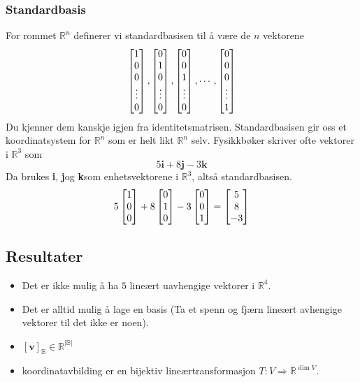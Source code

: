 \documentclass[12pt,a4paper,norsk]{article}
\makeatletter
\newcommand{\R}{\mathbb{R}}
\newcommand{\B}{\mathbb{B}}
\newcommand{\mat}[2]{\left[\begin{array}{@{}#1@{}}#2\end{array}\right]}
\newcommand{\vv}{\textbf{v}}
\newcommand{\vi}{\textbf{i}}
\newcommand{\vj}{\textbf{j}}
\newcommand{\vk}{\textbf{k}}
\makeatother
\begin{document}
\subsubsection{Standardbasis}
For rommet $\R^{n}$ definerer vi standardbasisen til å være de $n$ vektorene
\[\mat{c}{1\\0\\0\\ \vdots \\ 0}, \mat{c}{0\\1\\0\\ \vdots \\ 0}, \mat{c}{0\\0\\1\\ \vdots \\ 0}, \cdots, \mat{c}{0\\0\\0\\ \vdots \\ 1}\]
Du kjenner dem kanskje igjen fra identitetsmatrisen.
Standardbasisen gir oss et koordinatsystem for $\R^n$ som er helt likt $\R^n$ selv.
Fysikkbøker skriver ofte vektorer i $\R^3$ som
\[5\vi + 8\vj -3\vk\]
Da brukes \vi, \vj og \vk som enhetsvektorene i $\R^3$, altså standardbasisen.
\[5\mat{c}{1 \\ 0 \\ 0} + 8\mat{c}{0 \\ 1 \\ 0} -3\mat{c}{0 \\ 0 \\ 1} = \mat{c}{5 \\ 8 \\ -3}\]

\subsection{Resultater}
\begin{itemize}
  \item Det er ikke mulig å ha $5$ lineært uavhengige vektorer i $\R^{4}$.
  \item Det er alltid mulig å lage en basis (Ta et spenn og fjærn lineært
    avhengige vektorer til det ikke er noen).
  \item $[\vv]_\B \in \R^{|\B|}$
  \item koordinatavbilding er en bijektiv lineærtransformasjon $T:V\Rightarrow \R^{\dim V}$.
\end{itemize}
\end{document}
